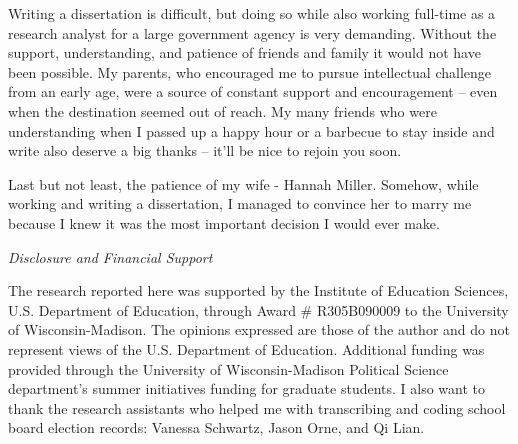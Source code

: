 Writing a dissertation is difficult, but doing so while also working full-time 
as a research analyst for a large government agency is very demanding. Without the 
support, understanding, and patience of friends and family it would not have been 
possible. My parents, who encouraged me to pursue intellectual challenge from an 
early age, were a source of constant support and encouragement -- even when the 
destination seemed out of reach. My many friends who were understanding when 
I passed up a happy hour or a barbecue to stay inside and write also deserve 
a big thanks -- it'll be nice to rejoin you soon. 

Last but not least, the patience of my wife - Hannah Miller. Somehow, while working 
and writing a dissertation, I managed to convince her to marry me because I knew 
it was the most important decision I would ever make. 

\emph{Disclosure and Financial Support}

The research reported here was supported by the Institute of Education Sciences, 
U.S. Department of Education, through Award \# R305B090009 to the University of 
Wisconsin-Madison.  The opinions expressed are those of the author and do 
not represent views of the U.S. Department of Education. Additional funding was 
provided through the University of Wisconsin-Madison Political Science 
department's summer initiatives funding for graduate students. I also want to 
thank the research assistants who helped me with transcribing and coding school 
board election records: Vanessa Schwartz, Jason Orne, and Qi Lian. 

